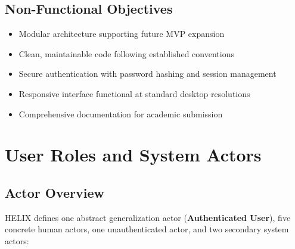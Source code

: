 \documentclass[12pt,a4paper]{report}
\begin{document}
	\section{Non-Functional Objectives}
	\begin{itemize}
		\item Modular architecture supporting future MVP expansion
		\item Clean, maintainable code following established conventions
		\item Secure authentication with password hashing and session management
		\item Responsive interface functional at standard desktop resolutions
		\item Comprehensive documentation for academic submission
	\end{itemize}
	
	\chapter{User Roles and System Actors}
	
	\section{Actor Overview}
	HELIX defines one abstract generalization actor (\textbf{Authenticated User}), five concrete human actors, one unauthenticated actor, and two secondary system actors:
	
\end{document}
